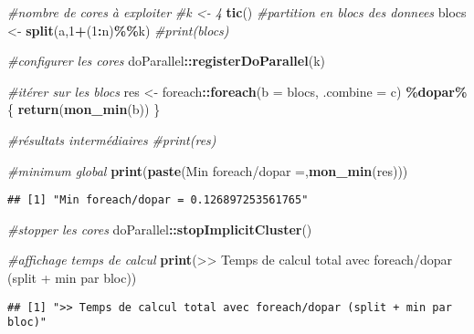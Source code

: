 \documentclass[
]{article}
\newenvironment{Shaded}{\begin{snugshade}}{\end{snugshade}}
\newcommand{\AttributeTok}[1]{\textcolor[rgb]{0.13,0.29,0.53}{#1}}
\newcommand{\CommentTok}[1]{\textcolor[rgb]{0.56,0.35,0.01}{\textit{#1}}}
\newcommand{\DecValTok}[1]{\textcolor[rgb]{0.00,0.00,0.81}{#1}}
\newcommand{\FunctionTok}[1]{\textcolor[rgb]{0.13,0.29,0.53}{\textbf{#1}}}
\newcommand{\NormalTok}[1]{#1}
\newcommand{\OtherTok}[1]{\textcolor[rgb]{0.56,0.35,0.01}{#1}}
\newcommand{\SpecialCharTok}[1]{\textcolor[rgb]{0.81,0.36,0.00}{\textbf{#1}}}
\newcommand{\StringTok}[1]{\textcolor[rgb]{0.31,0.60,0.02}{#1}}
\begin{document}
\begin{Shaded}
\begin{Highlighting}[]
\CommentTok{\#nombre de cores à exploiter}
\CommentTok{\#k \textless{}{-} 4}
\FunctionTok{tic}\NormalTok{()}
\CommentTok{\#partition en blocs des donnees}
\NormalTok{blocs }\OtherTok{\textless{}{-}} \FunctionTok{split}\NormalTok{(a,}\DecValTok{1}\SpecialCharTok{+}\NormalTok{(}\DecValTok{1}\SpecialCharTok{:}\NormalTok{n)}\SpecialCharTok{\%\%}\NormalTok{k)}
\CommentTok{\#print(blocs)}

\CommentTok{\#configurer les cores}
\NormalTok{doParallel}\SpecialCharTok{::}\FunctionTok{registerDoParallel}\NormalTok{(k)}

\CommentTok{\#itérer sur les blocs}
\NormalTok{res }\OtherTok{\textless{}{-}}\NormalTok{ foreach}\SpecialCharTok{::}\FunctionTok{foreach}\NormalTok{(}\AttributeTok{b =}\NormalTok{ blocs, }\AttributeTok{.combine =}\NormalTok{ c) }\SpecialCharTok{\%dopar\%}\NormalTok{ \{}
  \FunctionTok{return}\NormalTok{(}\FunctionTok{mon\_min}\NormalTok{(b))}
\NormalTok{\}}

\CommentTok{\#résultats intermédiaires}
\CommentTok{\#print(res)}

\CommentTok{\#minimum global}
\FunctionTok{print}\NormalTok{(}\FunctionTok{paste}\NormalTok{(}\StringTok{\textquotesingle{}Min foreach/dopar =\textquotesingle{}}\NormalTok{,}\FunctionTok{mon\_min}\NormalTok{(res)))}
\end{Highlighting}
\end{Shaded}

\begin{verbatim}
## [1] "Min foreach/dopar = 0.126897253561765"
\end{verbatim}

\begin{Shaded}
\begin{Highlighting}[]
\CommentTok{\#stopper les cores}
\NormalTok{doParallel}\SpecialCharTok{::}\FunctionTok{stopImplicitCluster}\NormalTok{()}

\CommentTok{\#affichage temps de calcul}
\FunctionTok{print}\NormalTok{(}\StringTok{\textquotesingle{}\textgreater{}\textgreater{} Temps de calcul total avec foreach/dopar (split + min par bloc)\textquotesingle{}}\NormalTok{)}
\end{Highlighting}
\end{Shaded}

\begin{verbatim}
## [1] ">> Temps de calcul total avec foreach/dopar (split + min par bloc)"
\end{verbatim}
\end{document}

